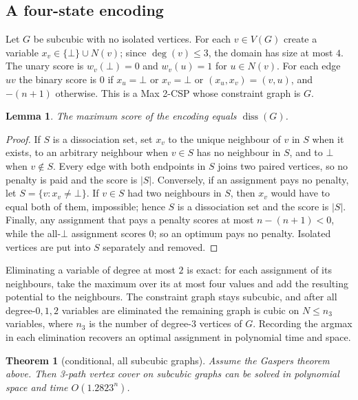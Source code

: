 \documentclass[11pt]{article}
\newtheorem{lemma}{Lemma}
\newtheorem*{theorem*}{Theorem}
\begin{document}
\subsection*{A four-state encoding}

Let \(G\) be subcubic with no isolated vertices. For each \(v\in V(G)\) create a
variable \(x_v\in\{\bot\}\cup N(v)\); since \(\deg(v)\le3\), the domain has size at
most \(4\). The unary score is \(w_v(\bot)=0\) and \(w_v(u)=1\) for \(u\in N(v)\).
For each edge \(uv\) the binary score is \(0\) if \(x_u=\bot\) or \(x_v=\bot\) or
\((x_u,x_v)=(v,u)\), and \(-(n+1)\) otherwise. This is a Max 2-CSP whose constraint
graph is \(G\).

\begin{lemma}
The maximum score of the encoding equals \(\operatorname{diss}(G)\).
\end{lemma}

\begin{proof}
If \(S\) is a dissociation set, set \(x_v\) to the unique neighbour of \(v\) in \(S\)
when it exists, to an arbitrary neighbour when \(v\in S\) has no neighbour in \(S\),
and to \(\bot\) when \(v\notin S\). Every edge with both endpoints in \(S\) joins two
paired vertices, so no penalty is paid and the score is \(|S|\). Conversely, if an
assignment pays no penalty, let \(S=\{v:x_v\ne\bot\}\). If \(v\in S\) had two
neighbours in \(S\), then \(x_v\) would have to equal both of them, impossible; hence
\(S\) is a dissociation set and the score is \(|S|\). Finally, any assignment that
pays a penalty scores at most \(n-(n+1)<0\), while the all-\(\bot\) assignment
scores \(0\); so an optimum pays no penalty. Isolated vertices are put into \(S\)
separately and removed.
\end{proof}

Eliminating a variable of degree at most \(2\) is exact: for each assignment of its
neighbours, take the maximum over its at most four values and add the resulting
potential to the neighbours. The constraint graph stays subcubic, and after all
degree-\(0,1,2\) variables are eliminated the remaining graph is cubic on
\(N\le n_3\) variables, where \(n_3\) is the number of degree-\(3\) vertices of
\(G\). Recording the argmax in each elimination recovers an optimal assignment in
polynomial time and space.

\begin{theorem*}[conditional, all subcubic graphs]
Assume the Gaspers theorem above. Then 3-path vertex cover on subcubic graphs can be
solved in polynomial space and time \(O(1.2823^n)\).
\end{theorem*}
\end{document}
